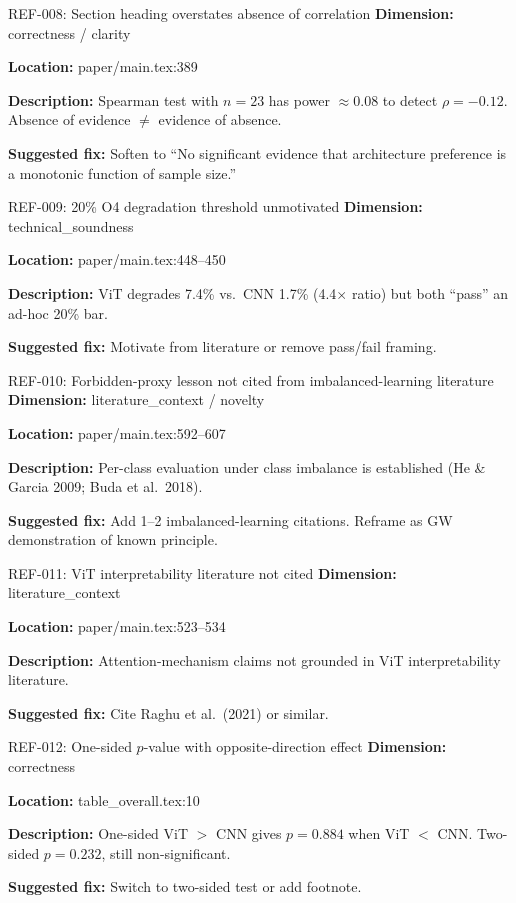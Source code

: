 \documentclass[11pt]{article}
\begin{document}
\begin{MinorIssueBox}{REF-008: Section heading overstates absence of correlation}
\textbf{Dimension:} correctness / clarity

\textbf{Location:} paper/main.tex:389

\textbf{Description:} Spearman test with $n=23$ has power $\approx 0.08$ to detect $\rho = -0.12$. Absence of evidence $\neq$ evidence of absence.

\textbf{Suggested fix:} Soften to ``No significant evidence that architecture preference is a monotonic function of sample size.''
\end{MinorIssueBox}

\begin{MinorIssueBox}{REF-009: 20\% O4 degradation threshold unmotivated}
\textbf{Dimension:} technical\_soundness

\textbf{Location:} paper/main.tex:448--450

\textbf{Description:} ViT degrades 7.4\% vs.\ CNN 1.7\% (4.4$\times$ ratio) but both ``pass'' an ad-hoc 20\% bar.

\textbf{Suggested fix:} Motivate from literature or remove pass/fail framing.
\end{MinorIssueBox}

\begin{MinorIssueBox}{REF-010: Forbidden-proxy lesson not cited from imbalanced-learning literature}
\textbf{Dimension:} literature\_context / novelty

\textbf{Location:} paper/main.tex:592--607

\textbf{Description:} Per-class evaluation under class imbalance is established (He \& Garcia 2009; Buda et al.\ 2018).

\textbf{Suggested fix:} Add 1--2 imbalanced-learning citations. Reframe as GW demonstration of known principle.
\end{MinorIssueBox}

\begin{MinorIssueBox}{REF-011: ViT interpretability literature not cited}
\textbf{Dimension:} literature\_context

\textbf{Location:} paper/main.tex:523--534

\textbf{Description:} Attention-mechanism claims not grounded in ViT interpretability literature.

\textbf{Suggested fix:} Cite Raghu et al.\ (2021) or similar.
\end{MinorIssueBox}

\begin{MinorIssueBox}{REF-012: One-sided $p$-value with opposite-direction effect}
\textbf{Dimension:} correctness

\textbf{Location:} table\_overall.tex:10

\textbf{Description:} One-sided ViT $>$ CNN gives $p = 0.884$ when ViT $<$ CNN. Two-sided $p = 0.232$, still non-significant.

\textbf{Suggested fix:} Switch to two-sided test or add footnote.
\end{MinorIssueBox}
\end{document}
